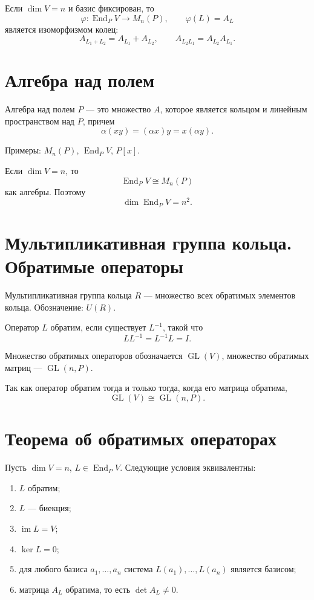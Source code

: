 \documentclass[12pt,a4paper]{article}
\DeclareMathOperator{\End}{End}
\DeclareMathOperator{\Ker}{ker}
\DeclareMathOperator{\Image}{im}
\DeclareMathOperator{\GL}{GL}
\begin{document}
Если $\dim V=n$ и базис фиксирован, то
\[
    \varphi:\End_PV\to M_n(P),\qquad \varphi(L)=A_L
\]
является изоморфизмом колец:
\[
    A_{L_1+L_2}=A_{L_1}+A_{L_2},\qquad A_{L_2L_1}=A_{L_2}A_{L_1}.
\]

\section{Алгебра над полем}

Алгебра над полем $P$ --- это множество $A$, которое является кольцом и линейным пространством над $P$, причем
\[
    \alpha(xy)=(\alpha x)y=x(\alpha y).
\]

Примеры: $M_n(P)$, $\End_PV$, $P[x]$.

Если $\dim V=n$, то
\[
    \End_PV\cong M_n(P)
\]
как алгебры. Поэтому
\[
    \dim\End_PV=n^2.
\]

\section{Мультипликативная группа кольца. Обратимые операторы}

Мультипликативная группа кольца $R$ --- множество всех обратимых элементов кольца. Обозначение: $U(R)$.

Оператор $L$ обратим, если существует $L^{-1}$, такой что
\[
    LL^{-1}=L^{-1}L=I.
\]

Множество обратимых операторов обозначается $\GL(V)$, множество обратимых матриц --- $\GL(n,P)$.

Так как оператор обратим тогда и только тогда, когда его матрица обратима,
\[
    \GL(V)\cong\GL(n,P).
\]

\section{Теорема об обратимых операторах}

Пусть $\dim V=n$, $L\in\End_PV$. Следующие условия эквивалентны:

\begin{enumerate}
    \item $L$ обратим;
    \item $L$ --- биекция;
    \item $\Image L=V$;
    \item $\Ker L=0$;
    \item для любого базиса $a_1,\ldots,a_n$ система $L(a_1),\ldots,L(a_n)$ является базисом;
    \item матрица $A_L$ обратима, то есть $\det A_L\ne0$.
\end{enumerate}
\end{document}
